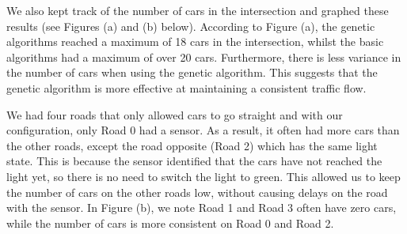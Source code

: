 \documentclass{article}
\begin{document}
We also kept track of the number of cars in the intersection and graphed these results (see Figures (a) and (b) below). According to Figure (a), the genetic algorithms reached a maximum of 18 cars in the intersection, whilst the basic algorithms had a maximum of over 20 cars. Furthermore, there is less variance in the number of cars when using the genetic algorithm. This suggests that the genetic algorithm is more effective at maintaining a consistent traffic flow.

We had four roads that only allowed cars to go straight and with our configuration, only Road 0 had a sensor. As a result, it often had more cars than the other roads, except the road opposite (Road 2) which has the same light state. This is because the sensor identified that the cars have not reached the light yet, so there is no need to switch the light to green. This allowed us to keep the number of cars on the other roads low, without causing delays on the road with the sensor. In Figure (b), we note Road 1 and Road 3 often have zero cars, while the number of cars is more consistent on Road 0 and Road 2.
\end{document}
